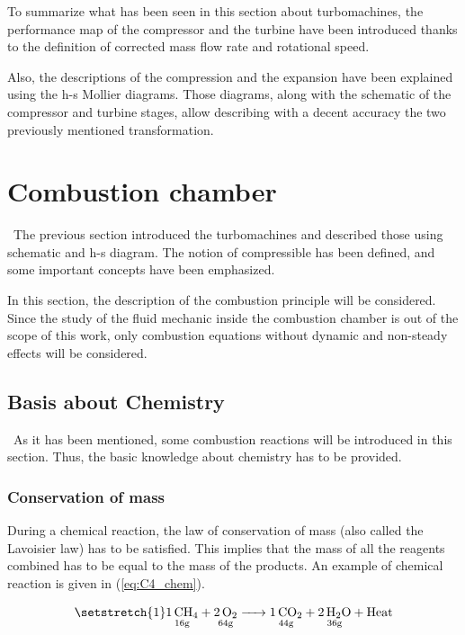 To summarize what has been seen in this section about turbomachines, the performance map of the compressor and the turbine
have been introduced thanks to the definition of corrected mass flow rate and rotational speed.

Also, the descriptions of the compression and the expansion have been explained using the h-s Mollier diagrams. Those diagrams, along with the schematic of the compressor and turbine stages, allow describing with a decent accuracy the two previously mentioned transformation.

\newpage
\section{Combustion chamber}
\quad\ The previous section introduced the turbomachines and described those using schematic and h-s diagram. The notion of compressible has been defined, and some important concepts have been emphasized.

In this section, the description of the combustion principle will be considered. Since the study of the fluid mechanic inside the combustion chamber is out of the scope of this work, only combustion equations without dynamic and non-steady effects will be considered.

\subsection{Basis about Chemistry}
\quad\ As it has been mentioned, some combustion reactions will be introduced in this section. Thus, the basic knowledge about chemistry has to be provided.

\subsubsection{Conservation of mass}
During a chemical reaction, the law of conservation of mass (also called the Lavoisier law) has to be satisfied. This implies that the mass of all the reagents combined has to be equal to the mass of the products. An example of chemical reaction is given in (\ref{eq:C4_chem}).

\begin{equation}
    \setstretch{1}
    \underset{\mathrm{16g}}{\ce{1CH4}} \ce{+} \underset{\mathrm{64g}}{\ce{2O2}} \ce{->} \underset{\mathrm{44g}}{\ce{1CO2}} \ce{+} \underset{\mathrm{36g}}{\ce{2H2O}} \ce{+}\text{Heat}\label{eq:C4_chem}
\end{equation}

